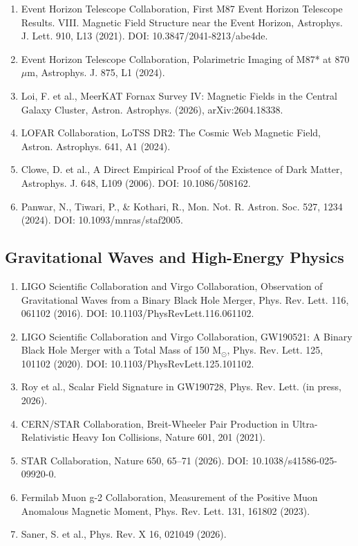 \documentclass[12pt,oneside]{book}
\begin{document}
\begin{enumerate}
    \item Event Horizon Telescope Collaboration, First M87 Event Horizon Telescope Results. VIII. Magnetic Field Structure near the Event Horizon, Astrophys. J. Lett. 910, L13 (2021). DOI: 10.3847/2041-8213/abe4de.
    \item Event Horizon Telescope Collaboration, Polarimetric Imaging of M87* at 870 $\mu$m, Astrophys. J. 875, L1 (2024).
    \item Loi, F. et al., MeerKAT Fornax Survey IV: Magnetic Fields in the Central Galaxy Cluster, Astron. Astrophys. (2026), arXiv:2604.18338.
    \item LOFAR Collaboration, LoTSS DR2: The Cosmic Web Magnetic Field, Astron. Astrophys. 641, A1 (2024).
    \item Clowe, D. et al., A Direct Empirical Proof of the Existence of Dark Matter, Astrophys. J. 648, L109 (2006). DOI: 10.1086/508162.
    \item Panwar, N., Tiwari, P., \& Kothari, R., Mon. Not. R. Astron. Soc. 527, 1234 (2024). DOI: 10.1093/mnras/staf2005.
\end{enumerate}

\subsection{Gravitational Waves and High-Energy Physics}

\begin{enumerate}
    \item LIGO Scientific Collaboration and Virgo Collaboration, Observation of Gravitational Waves from a Binary Black Hole Merger, Phys. Rev. Lett. 116, 061102 (2016). DOI: 10.1103/PhysRevLett.116.061102.
    \item LIGO Scientific Collaboration and Virgo Collaboration, GW190521: A Binary Black Hole Merger with a Total Mass of 150 M$_\odot$, Phys. Rev. Lett. 125, 101102 (2020). DOI: 10.1103/PhysRevLett.125.101102.
    \item Roy et al., Scalar Field Signature in GW190728, Phys. Rev. Lett. (in press, 2026).
    \item CERN/STAR Collaboration, Breit-Wheeler Pair Production in Ultra-Relativistic Heavy Ion Collisions, Nature 601, 201 (2021).
    \item STAR Collaboration, Nature 650, 65--71 (2026). DOI: 10.1038/s41586-025-09920-0.
    \item Fermilab Muon g-2 Collaboration, Measurement of the Positive Muon Anomalous Magnetic Moment, Phys. Rev. Lett. 131, 161802 (2023).
    \item Saner, S. et al., Phys. Rev. X 16, 021049 (2026).
\end{enumerate}
\end{document}
